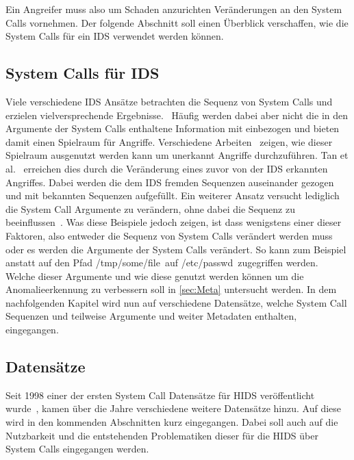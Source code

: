         Ein Angreifer muss also um Schaden anzurichten Veränderungen an den System Calls vornehmen.
        Der folgende Abschnitt soll einen Überblick verschaffen, wie die System Calls für ein \ac{IDS} verwendet werden können.

        \subsection{System Calls für IDS}
            Viele verschiedene \ac{IDS} Ansätze betrachten die Sequenz von System Calls und erzielen vielversprechende Ergebnisse.~\cite{MAGGI}
            Häufig werden dabei aber nicht die in den Argumente der System Calls enthaltene Information mit einbezogen und bieten damit einen Spielraum für Angriffe.
            Verschiedene Arbeiten~\cite{Syscallseqexploit1, Syscallseqexploit2, Syscallseqexploit3} zeigen, wie dieser Spielraum ausgenutzt werden kann um unerkannt Angriffe durchzuführen. 
            Tan et al.~\cite{Syscallseqexploit3} erreichen dies durch die Veränderung eines zuvor von der \ac{IDS} erkannten Angriffes.
            Dabei werden die dem \ac{IDS} fremden Sequenzen auseinander gezogen und mit bekannten Sequenzen aufgefüllt. 
            Ein weiterer Ansatz versucht lediglich die System Call Argumente zu verändern, ohne dabei die Sequenz zu beeinflussen~\cite{Syscallseqexploit1}.
            Was diese Beispiele jedoch zeigen, ist dass wenigstens einer dieser Faktoren, also entweder die Sequenz von System Calls verändert werden muss oder es werden die Argumente der System Calls verändert.
            So kann zum Beispiel anstatt auf den Pfad \glqq /tmp/some/file\grqq \ auf \glqq /etc/passwd\grqq \ zugegriffen werden. 
            Welche dieser Argumente und wie diese genutzt werden können um die Anomalieerkennung zu verbessern soll in \autoref{sec:Meta} untersucht werden.
            In dem nachfolgenden Kapitel wird nun auf verschiedene Datensätze, welche System Call Sequenzen und teilweise Argumente und weiter Metadaten enthalten, eingegangen.

        \subsection{Datensätze}\label{sec:Datensatz}
            Seit 1998 einer der ersten System Call Datensätze für \ac{HIDS} veröffentlicht wurde~\cite{DARPA, KDD},
            kamen über die Jahre verschiedene weitere Datensätze hinzu.
            Auf diese wird in den kommenden Abschnitten kurz eingegangen.
            Dabei soll auch auf die Nutzbarkeit und die entstehenden Problematiken dieser für die \ac{HIDS} über System Calls eingegangen werden.
